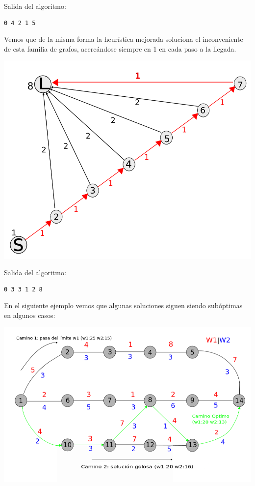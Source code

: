 \vspace{5mm}
Salida del algoritmo:

\begin{lstlisting}[frame=single]
0 4 2 1 5
\end{lstlisting}

Vemos que de la misma forma la heur\'istica mejorada soluciona el inconveniente de esta familia de grafos, acerc\'andose siempre en 1 en cada paso a la llegada.

\begin{center}
\includegraphics[scale=0.3]{img/grafoChotoNumerado.png}
\end{center}

\vspace{10mm}

Salida del algoritmo:

\begin{lstlisting}[frame=single]
0 3 3 1 2 8
\end{lstlisting}


En el siguiente ejemplo vemos que algunas soluciones siguen siendo sub\'optimas en algunos casos:

\begin{center}
\includegraphics[scale=0.6]{img/grafoMasCompletoGreedy.png}
\end{center}


